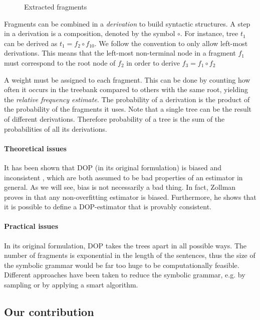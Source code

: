 \begin{figure}[h!]
\center 
\caption{Extracted fragments}
\label{f:fragments}
\end{figure}


Fragments can be combined in a \emph{derivation} to build syntactic structures. A step in a derivation is a composition, denoted by the symbol $\circ$. For instance, tree $t_1$ can be derived as $t_1=f_2\circ f_{10}$. We follow the convention to only allow left-most derivations. This means that the left-most non-terminal node in a fragment $f_1$ must correspond to the root node of $f_2$ in order to derive $f_3=f_1\circ f_2$

A weight must be assigned to each fragment. This can be done by counting how often it occurs in the treebank compared to others with the same root, yielding the \emph{relative frequency estimate}. The probability of a derivation is the product of the probability of the fragments it uses. Note that a single tree can be the result of different derivations. Therefore probability of a tree is the sum of the probabilities of all its derivations.

\paragraph{Theoretical issues}
It has been shown that DOP (in its original formulation) is biased and inconsistent \cite{johnson2002}, which are both assumed to be bad properties of an estimator in general. As we will see, bias is not necessarily a bad thing. In fact, Zollman proves in  \cite{zollmann2005} that any non-overfitting estimator is biased. Furthermore, he shows that it is possible to define a DOP-estimator that is provably consistent.


\paragraph{Practical issues}
In its original formulation, DOP takes the trees apart in all possible ways. The number of fragments is exponential in the length of the sentences, thus the size of the symbolic grammar would be far too huge to be computationally feasible. 
Different approaches have been taken to reduce the symbolic grammar, e.g. by sampling or by applying a smart algorithm.

\subsection{Our contribution}

